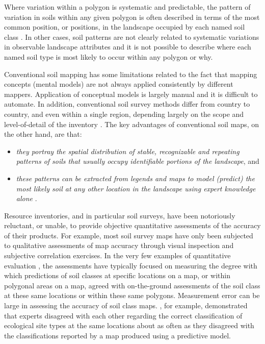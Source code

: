 \documentclass[graybox,natbib,nospthms,UStrade]{svmono}
\begin{document}
Where variation within a polygon is systematic and predictable, the
pattern of variation in soils within any given polygon is often
described in terms of the most common position, or positions, in the
landscape occupied by each named soil class \citet{MacMillan2005CJSS}. In other cases, soil
patterns are not clearly related to systematic variations in observable
landscape attributes and it is not possible to describe where each named
soil type is most likely to occur within any polygon or why.

Conventional soil mapping has some limitations related to the fact that
mapping concepts (mental models) are not always applied consistently by different mappers. Application of conceptual models is largely
manual and it is difficult to automate. In addition, conventional soil
survey methods differ from country to country, and even within a single
region, depending largely on the scope and level-of-detail of the
inventory \citep{Schelling1970Geoderma, SSS1983USDA, Rossiter2001}. The key
advantages of conventional soil maps, on the other hand, are that:

\begin{itemize}
\item
  \emph{they portray the spatial distribution of stable, recognizable and
  repeating patterns of soils that usually occupy identifiable portions of the landscape}, and
\item
  \emph{these patterns can be extracted from legends and maps to model (predict) the
  most likely soil at any other location in the landscape using expert
  knowledge alone} \citep{Zhu2001}.
\end{itemize}

Resource inventories, and in particular soil surveys, have been
notoriously reluctant, or unable, to provide objective quantitative
assessments of the accuracy of their products. For example, most soil
survey maps have only been subjected to qualitative assessments of map
accuracy through visual inspection and subjective correlation exercises.
In the very few examples of quantitative evaluation
\citep{Marsman1986ALTERRA, Finke2006Elsevier}, the assessments have
typically focused on measuring the degree with which predictions of
soil classes at specific locations on a map, or within polygonal areas
on a map, agreed with on-the-ground assessments of the soil class at
these same locations or within these same polygons. Measurement error
can be large in assessing the accuracy of soil class maps.
\citet{MacMillan2010DSM}, for example, demonstrated that experts disagreed
with each other regarding the correct classification of ecological site
types at the same locations about as often as they disagreed with the
classifications reported by a map produced using a predictive model.
\end{document}
